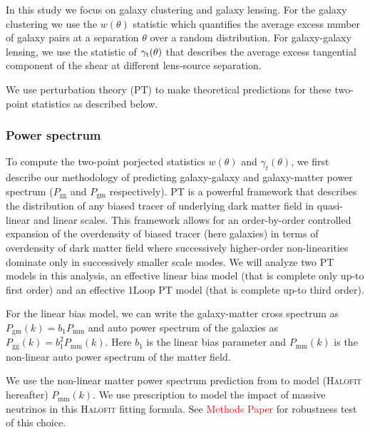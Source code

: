\documentclass[fleqn,usenatbib]{mnras}
\newcommand{\gammat}{\ensuremath{\gamma_{t}(\theta)}}
\newcommand{\wtheta}{\ensuremath{w(\theta)}}
\newcommand{\pgg}{\ensuremath{P_{\mathrm{gg}}}}
\newcommand{\pgm}{\ensuremath{P_{\mathrm{gm}}}}
\newcommand{\red}[1]{\textcolor{red}{#1}}
\begin{document}
In this study we focus on galaxy clustering and galaxy lensing. For the galaxy clustering we use the $w(\theta)$ statistic which quantifies the average excess number of galaxy pairs at a separation $\theta$ over a random distribution. For galaxy-galaxy lensing, we use the statistic of $\gamma_{\rm t}(\theta)$ that describes the average excess tangential component of the shear at different lens-source separation. 

We use perturbation theory (PT) to make theoretical predictions for these two-point statistics as described below. 

\subsubsection{Power spectrum}
\label{sec:Pk_pred}

To compute the two-point porjected statistics $\wtheta$ and $\gammat$, we first describe our methodology of predicting galaxy-galaxy and galaxy-matter power spectrum ($\pgg$ and $\pgm$ respectively). PT is a powerful framework that describes the distribution of any biased tracer of underlying dark matter field in quasi-linear and linear scales. This framework allows for an order-by-order controlled expansion of the overdensity of biased tracer (here galaxies) in terms of overdensity of dark matter field where successively higher-order non-linearities dominate only in successively smaller scale modes. We will analyze two PT models in this analysis, an effective linear bias model (that is complete only up-to first order) and an effective 1Loop PT model (that is complete up-to third order). 

For the linear bias model, we can write the galaxy-matter cross spectrum as $P_{\mathrm{gm}}(k) = b_1 P_{\mathrm{mm}}$ and auto power spectrum of the galaxies as $P_{\mathrm{gg}}(k) = b_1^2 P_{\mathrm{mm}}(k)$. Here $b_1$ is the linear bias parameter and $P_{\mathrm{mm}}(k)$ is the non-linear auto power spectrum of the matter field. 

We use the non-linear matter power spectrum prediction from \citet{Takahashi:2012em} to model (\textsc{Halofit} hereafter) $P_{\mathrm{mm}}(k)$. We use \citet{Bird_halofit} prescription to model the impact of massive neutrinos in this \textsc{Halofit} fitting formula. See \red{Methods Paper} for robustness test of this choice.  

\end{document}
